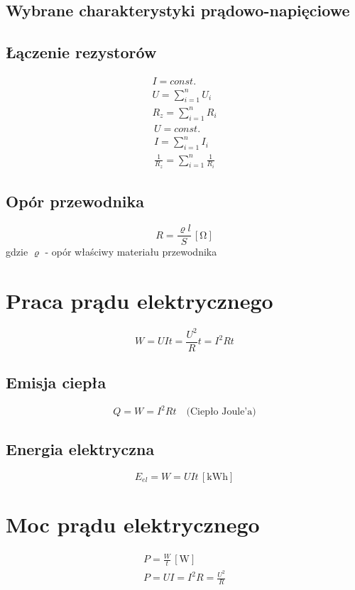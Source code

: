 \documentclass{report}
\numberwithin{equation}{chapter}
\newcommand{\unit}[1]{\,\left[\mathrm{#1}\right]}
\begin{document}
      \subsection{Wybrane charakterystyki prądowo-napięciowe}
      \subsection{Łączenie rezystorów}
        \begin{gather}
          I = const.\\
          U = \sum_{i=1}^n U_i\\
          R_z = \sum_{i=1}^n R_i
        \end{gather}
        \begin{gather}
          U = const.\\
          I = \sum_{i=1}^n I_i\\
          \frac{1}{R_z} = \sum_{i=1}^n \frac{1}{R_i}
        \end{gather}
      \subsection{Opór przewodnika}
        \begin{equation}
          R = \frac{\varrho l}{S} \unit{\Omega}
        \end{equation}
      gdzie $\varrho$ - opór właściwy materiału przewodnika
    \section{Praca prądu elektrycznego}
      \begin{equation}
        W = UIt = \frac{U^2}{R}t = I^2Rt
      \end{equation}
      \subsection{Emisja ciepła}
        \begin{equation}
          Q = W = I^2Rt \quad\text{(Ciepło Joule'a)}
        \end{equation}
      \subsection{Energia elektryczna}
        \begin{equation}
          E_{el} = W = UIt \unit{kWh}
        \end{equation}
    \section{Moc prądu elektrycznego}
      \begin{gather}
        P = \frac{W}{t} \unit{W}\\
        P = UI = I^2R = \frac{U^2}{R}
      \end{gather}
\end{document}
